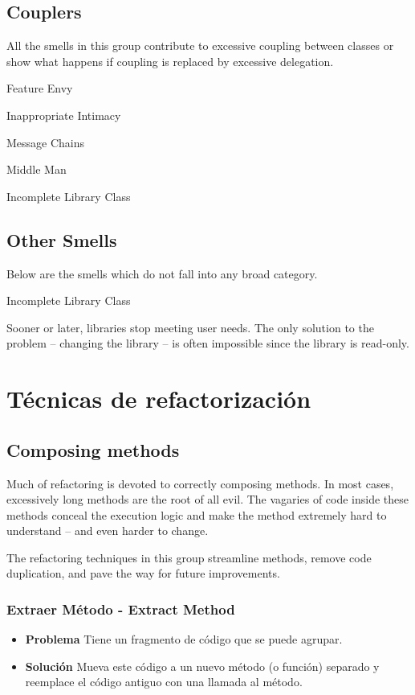 \documentclass[11pt,a4paper,oneside]{book}
\begin{document}
\section{Couplers}

All the smells in this group contribute to excessive coupling between classes or show what happens if coupling is replaced by excessive delegation.

    Feature Envy
    
    Inappropriate Intimacy
    
    Message Chains
    
    Middle Man

    Incomplete Library Class


\section{Other Smells}

Below are the smells which do not fall into any broad category.

Incomplete Library Class

Sooner or later, libraries stop meeting user needs. The only solution to the problem – changing the library – is often impossible since the library is read-only.



\chapter{Técnicas de refactorización}


\section{Composing methods}

Much of refactoring is devoted to correctly composing methods. In most cases, excessively long methods are the root of all evil. The vagaries of code inside these methods conceal the execution logic and make the method extremely hard to understand – and even harder to change.

The refactoring techniques in this group streamline methods, remove code duplication, and pave the way for future improvements.

\subsection{Extraer Método  - Extract Method}\label{sec:extractmethod}
\begin{itemize}
    \item \textbf{Problema} Tiene un fragmento de código que se puede agrupar.
    \item \textbf{Solución} Mueva este código a un nuevo método (o función) separado y reemplace el código antiguo con una llamada al método.
\end{itemize}
    
\end{document}
